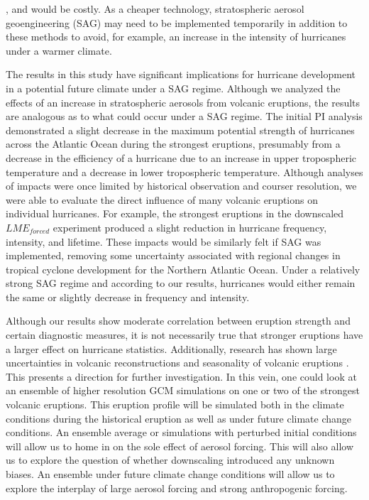 \documentclass[phd,tocprelim]{cornell}
\begin{document}
\cite{united2017emissions}, and would be costly. As a cheaper technology, 
stratospheric aerosol geoengineering (SAG) may need to be implemented 
temporarily in addition to these methods to avoid, for example, an increase 
in the intensity of hurricanes under a warmer climate. 
\par
The results in this study have significant implications for hurricane 
development in a potential future climate under a SAG regime.  Although we 
analyzed the effects of an increase in stratospheric aerosols from volcanic 
eruptions, the results are analogous as to what could occur under a SAG regime. 
The initial PI analysis demonstrated a slight decrease in the maximum potential 
strength of hurricanes across the Atlantic Ocean during the strongest eruptions, 
presumably from a decrease in the efficiency of a hurricane due to an increase 
in upper tropospheric temperature and a decrease in lower tropospheric 
temperature. Although analyses of impacts were once limited by historical 
observation and courser resolution, we were able to evaluate the direct 
influence of many volcanic eruptions on individual hurricanes.  For example, 
the strongest eruptions in the downscaled $LME_{forced}$ experiment produced 
a slight reduction in hurricane frequency, intensity, and lifetime. These 
impacts would be similarly felt if SAG was implemented, removing some 
uncertainty associated with regional changes in tropical cyclone development 
for the Northern Atlantic Ocean. Under a relatively strong SAG regime and 
according to our results, hurricanes would either remain the same or slightly 
decrease in frequency and intensity.
\par
Although our results show moderate correlation between eruption strength and 
certain diagnostic measures, it is not necessarily true that stronger 
eruptions have a larger effect on hurricane statistics. Additionally, research 
has shown large uncertainties in volcanic reconstructions and seasonality of 
volcanic eruptions \cite{schmidt2012climate,schmidt2011climate,stevenson2017role,raible2016tambora}. This presents a direction for further investigation. 
In this vein, one could look at an ensemble of higher resolution GCM simulations 
on one or two of the strongest volcanic eruptions. This eruption profile 
will be simulated both in the climate conditions during the historical eruption 
as well as under future climate change conditions. An ensemble average or 
simulations with perturbed initial conditions will allow us to home in on the 
sole effect of aerosol forcing. This will also allow us to explore the 
question of whether downscaling introduced any unknown biases. An ensemble 
under future climate change conditions will allow us to explore the interplay 
of large aerosol forcing and strong anthropogenic forcing.    
\par
\end{document}
